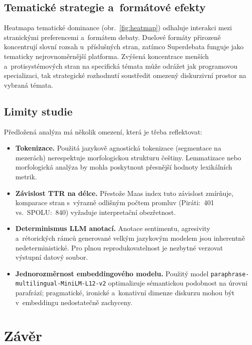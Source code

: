\documentclass[12pt, a4paper]{article}
\newcommand{\modelname}{\texttt{paraphrase-\allowbreak{}multilingual-\allowbreak{}MiniLM-\allowbreak{}L12-\allowbreak{}v2}}
\begin{document}
\subsection{Tematické strategie a~formátové efekty}

Heatmapa tematické dominance (obr.~\ref{fig:heatmap}) odhaluje interakci
mezi stranickými preferencemi a~formátem debaty. Duelové formáty přirozeně
koncentrují slovní rozsah u~příslušných stran, zatímco Superdebata funguje
jako tematicky nejrovnoměrnější platforma. Zvýšená koncentrace menších
a~protisystémových stran na specifická témata může odrážet jak programovou
specializaci, tak strategické rozhodnutí soustředit omezený diskurzivní
prostor na vybraná témata.

\subsection{Limity studie}

Předložená analýza má několik omezení, která je třeba reflektovat:

\begin{itemize}
  \item \textbf{Tokenizace.} Použitá jazykově agnostická tokenizace
  (segmentace na mezerách) nerespektuje morfologickou strukturu češtiny.
  Lemmatizace nebo morfologická analýza by mohla poskytnout přesnější
  hodnoty lexikálních metrik.

  \item \textbf{Závislost TTR na délce.} Přestože Maas index tuto
  závislost zmírňuje, komparace stran s~výrazně odlišným počtem promluv
  (Piráti:~401 vs.\ SPOLU:~840) vyžaduje interpretační obezřetnost.

  \item \textbf{Determinismus LLM anotací.} Anotace sentimentu,
  agresivity a~rétorických rámců generované velkým jazykovým modelem
  jsou inherentně nedeterministické. Pro plnou reprodukovatelnost
  je nezbytné verzovat výstupní datový soubor.

  \item \textbf{Jednorozměrnost embeddingového modelu.}
  Použitý model \modelname{} optimalizuje sémantickou podobnost
  na úrovni parafrází; pragmatické, ironické a~konativní dimenze
  diskurzu mohou být v~embeddingu nedostatečně zachyceny.
\end{itemize}

\section{Závěr}
\label{sec:zaver}
\end{document}
